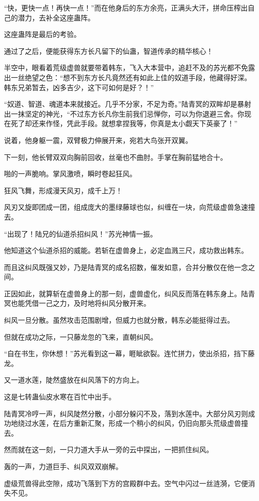 \begin{this_body}
“快，更快一点！再快一点！”而在他身后的东方余亮，正满头大汗，拼命压榨出自己的潜力，去补全这座蛊阵。

这座蛊阵是最后的考验。

通过了之后，便能获得东方长凡留下的仙蛊，智道传承的精华核心！

半空中，眼看着荒级虚兽就要带着韩东，飞入大本营中，追赶不及的苏光都不免露出一丝绝望之色：“想不到东方长凡竟然还有如此上佳的奴道手段，他藏得好深。韩东兄弟暂去，凶多吉少，这下可如何是好？！”

“奴道、智道、魂道本来就接近。几乎不分家，不足为奇。”陆青冥的双眸却是暴射出一抹坚定的神光，“不过东方长凡你生前我们忌惮你，可以为你退避三舍。你现在死了却还来作怪，凭此手段。就想拿捏我等，你真是太小觑天下英豪了！”

说着，他身躯一震，双臂极力伸展开来，宛若大鸟张开双翼。

下一刻，他长臂双双向胸前回收，丝毫也不曲肘。手掌在胸前猛地合十。

啪的一声脆响。掌风激喷，瞬时卷起狂风。

狂风飞舞，形成漫天风刃，成千上万！

风刃又旋即团成一团，组成庞大的墨绿藤球也似，纠缠在一块，向荒级虚兽急速撞去。

“出现了！陆兄的仙道杀招纠风！”苏光神情一振。

他知道这个仙道杀招的威能。若斩在虚兽身上，必定血溅三尺，成功救出韩东。

而且这纠风既强又妙，乃是陆青冥的成名招数，催发如意，合并分散仅在他一念之间。

正因如此，就算斩在虚兽身上的那一刻，虚兽虚化，纠风反而落在韩东身上。陆青冥也能凭借一己之力，及时地将纠风分散开来。

纠风一旦分散。虽然攻击范围剧增，但威力也就分散，韩东必能挺得过去。

但就在成功之际，一只藤龙忽的飞来，直朝纠风。

“自在书生，你休想！”苏光看到这一幕，睚眦欲裂。连忙拼力，使出杀招，挡下藤龙。

又一道水莲，陡然盛放在纠风落下的方向上。

这是七转蛊仙皮水寒在百忙中出手。

陆青冥冷哼一声，纠风陡然分散，小部分躲闪不及，落到水莲中。大部分风刃则成功地绕过水莲，在后方重新汇聚，形成一个稍小的纠风，仍旧向那头荒级虚兽撞去。

然而就在这一刻，一只力道大手从一旁的云中探出，一把抓住纠风。

轰的一声，力道巨手、纠风双双崩解。

虚级荒兽得此空隙，成功飞落到下方的宫殿群中去。空气中闪过一丝涟漪，它便消失不见。


\end{this_body}

